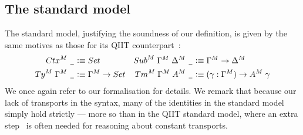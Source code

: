 \documentclass[a4paper,UKenglish,numberwithinsect,cleveref,thm-restate]{lipics-v2021}
\begin{document}
\subsection{The standard model} \label{subsec:std-model}
The standard model, justifying the soundness of our definition, is given by the same motives as those for its QIIT counterpart~\cite[Section~4]{Altenkirch2016a}:
\begin{align*}
  \Ctx^M\;\nameless          & \defeq \Set              & \Sub^M\;\Gamma^M\;\Delta^M\;\nameless & \defeq \Gamma^M \to \Delta^M \\
  \Ty^M\;\Gamma^M\;\nameless & \defeq \Gamma^M \to \Set & \Tm^M\;\Gamma^M\;A^M\;\nameless & \defeq (\gamma : \Gamma^M) \to A^M\;\gamma
\end{align*}
%
We once again refer to our \Agda formalisation for details.
We remark that because our lack of transports in the syntax, many of the identities in the standard model simply hold strictly --- more so than in the QIIT standard model, where an extra step~\cite[Lemma~2.3.5]{UFP2013} is often needed for reasoning about constant transports.
\end{document}
